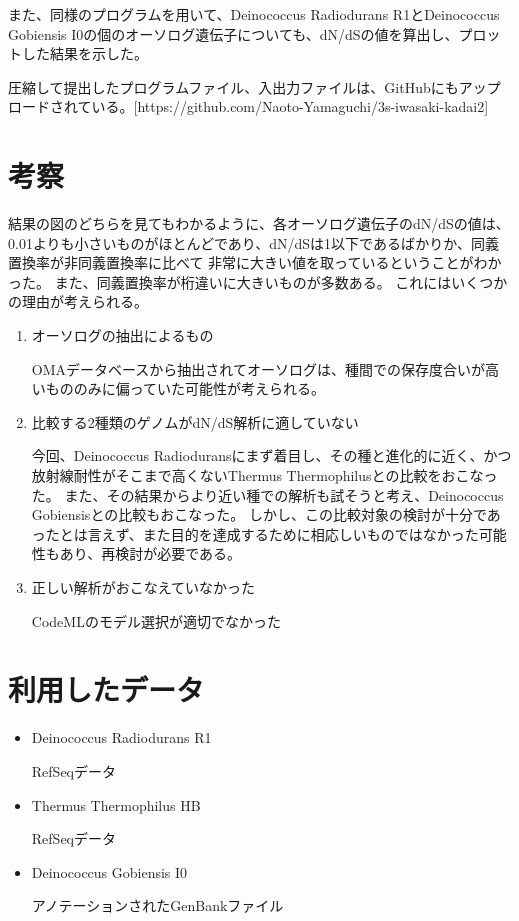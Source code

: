\documentclass[a4j,12pt]{jreport}
\begin{document}
また、同様のプログラムを用いて、Deinococcus Radiodurans R1とDeinococcus Gobiensis I0の個のオーソログ遺伝子についても、dN/dSの値を算出し、プロットした結果を示した。

圧縮して提出したプログラムファイル、入出力ファイルは、GitHubにもアップロードされている。[https://github.com/Naoto-Yamaguchi/3s-iwasaki-kadai2]



\section{考察}
結果の図のどちらを見てもわかるように、各オーソログ遺伝子のdN/dSの値は、0.01よりも小さいものがほとんどであり、dN/dSは1以下であるばかりか、同義置換率が非同義置換率に比べて
非常に大きい値を取っているということがわかった。
また、同義置換率が桁違いに大きいものが多数ある。
これにはいくつかの理由が考えられる。
  \begin{enumerate}
    \item オーソログの抽出によるもの
    
    OMAデータベースから抽出されてオーソログは、種間での保存度合いが高いもののみに偏っていた可能性が考えられる。
    \item 比較する2種類のゲノムがdN/dS解析に適していない
    
    今回、Deinococcus Radioduransにまず着目し、その種と進化的に近く、かつ放射線耐性がそこまで高くないThermus Thermophilusとの比較をおこなった。
    また、その結果からより近い種での解析も試そうと考え、Deinococcus Gobiensisとの比較もおこなった。
    しかし、この比較対象の検討が十分であったとは言えず、また目的を達成するために相応しいものではなかった可能性もあり、再検討が必要である。
  
    \item 正しい解析がおこなえていなかった
    
    CodeMLのモデル選択が適切でなかった

  \end{enumerate}



\section{利用したデータ}
    \begin{itemize}     
        \item Deinococcus Radiodurans R1
        
        RefSeqデータ 
        \item Thermus Thermophilus HB
        
        RefSeqデータ
        \item Deinococcus Gobiensis I0
        
        アノテーションされたGenBankファイル

    \end{itemize}
\end{document}
